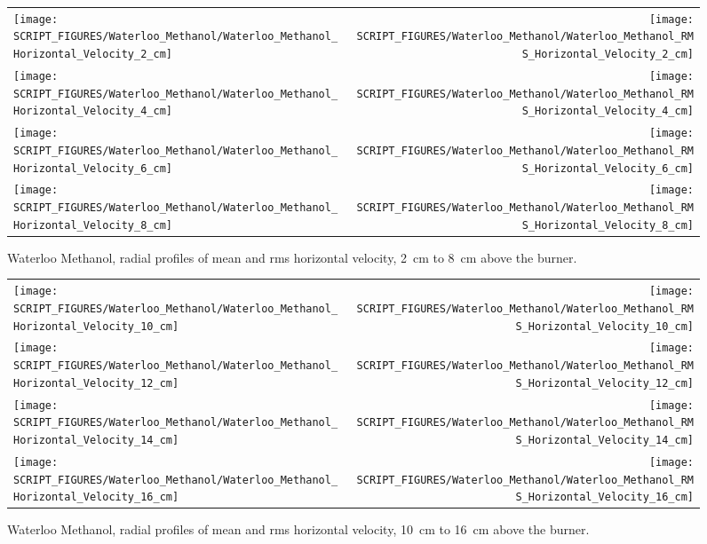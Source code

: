 \begin{figure}[p]
\begin{tabular*}{\textwidth}{l@{\extracolsep{\fill}}r}
\texttt{[image: SCRIPT\_FIGURES/Waterloo\_Methanol/Waterloo\_Methanol\_Horizontal\_Velocity\_2\_cm]} &
\texttt{[image: SCRIPT\_FIGURES/Waterloo\_Methanol/Waterloo\_Methanol\_RMS\_Horizontal\_Velocity\_2\_cm]} \\
\texttt{[image: SCRIPT\_FIGURES/Waterloo\_Methanol/Waterloo\_Methanol\_Horizontal\_Velocity\_4\_cm]} &
\texttt{[image: SCRIPT\_FIGURES/Waterloo\_Methanol/Waterloo\_Methanol\_RMS\_Horizontal\_Velocity\_4\_cm]} \\
\texttt{[image: SCRIPT\_FIGURES/Waterloo\_Methanol/Waterloo\_Methanol\_Horizontal\_Velocity\_6\_cm]} &
\texttt{[image: SCRIPT\_FIGURES/Waterloo\_Methanol/Waterloo\_Methanol\_RMS\_Horizontal\_Velocity\_6\_cm]} \\
\texttt{[image: SCRIPT\_FIGURES/Waterloo\_Methanol/Waterloo\_Methanol\_Horizontal\_Velocity\_8\_cm]} &
\texttt{[image: SCRIPT\_FIGURES/Waterloo\_Methanol/Waterloo\_Methanol\_RMS\_Horizontal\_Velocity\_8\_cm]}
\end{tabular*}
\caption[Waterloo Methanol, radial mean and rms horizontal velocity, 2~cm to 8~cm above burner]
{Waterloo Methanol, radial profiles of mean and rms horizontal velocity, 2~cm to 8~cm above the burner.}
\label{Water_Methanol_Hori_Vel_1}
\end{figure}

\begin{figure}[p]
\begin{tabular*}{\textwidth}{l@{\extracolsep{\fill}}r}
\texttt{[image: SCRIPT\_FIGURES/Waterloo\_Methanol/Waterloo\_Methanol\_Horizontal\_Velocity\_10\_cm]} &
\texttt{[image: SCRIPT\_FIGURES/Waterloo\_Methanol/Waterloo\_Methanol\_RMS\_Horizontal\_Velocity\_10\_cm]} \\
\texttt{[image: SCRIPT\_FIGURES/Waterloo\_Methanol/Waterloo\_Methanol\_Horizontal\_Velocity\_12\_cm]} &
\texttt{[image: SCRIPT\_FIGURES/Waterloo\_Methanol/Waterloo\_Methanol\_RMS\_Horizontal\_Velocity\_12\_cm]} \\
\texttt{[image: SCRIPT\_FIGURES/Waterloo\_Methanol/Waterloo\_Methanol\_Horizontal\_Velocity\_14\_cm]} &
\texttt{[image: SCRIPT\_FIGURES/Waterloo\_Methanol/Waterloo\_Methanol\_RMS\_Horizontal\_Velocity\_14\_cm]} \\
\texttt{[image: SCRIPT\_FIGURES/Waterloo\_Methanol/Waterloo\_Methanol\_Horizontal\_Velocity\_16\_cm]} &
\texttt{[image: SCRIPT\_FIGURES/Waterloo\_Methanol/Waterloo\_Methanol\_RMS\_Horizontal\_Velocity\_16\_cm]}
\end{tabular*}
\caption[Waterloo Methanol, radial mean and rms horizontal velocity, 10~cm to 16~cm above burner]
{Waterloo Methanol, radial profiles of mean and rms horizontal velocity, 10~cm to 16~cm above the burner.}
\label{Water_Methanol_Hori_Vel_2}
\end{figure}

